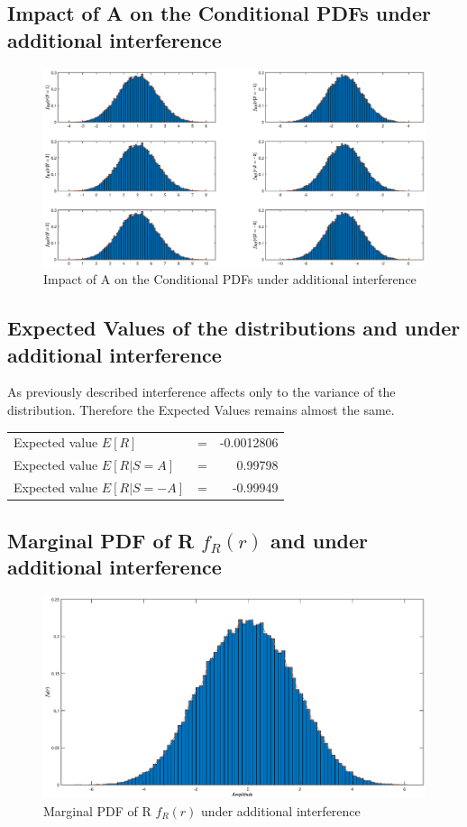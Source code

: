 \documentclass[a4paper,11pt]{article}%
\begin{document}
\pagebreak
\subsection{Impact of A on the Conditional PDFs under additional interference}
\begin{figure}[!h]
	\centering
	\includegraphics[scale=0.45]{figures/q6f3}
	\caption{Impact of A on the Conditional PDFs under additional interference}
\end{figure}

\subsection{Expected Values of the distributions and under additional interference}

As previously described interference affects only to the variance of the distribution. Therefore the Expected Values remains almost the same.\\

\begin{tabular}[!h]{l c r}
	Expected value $E[R]$& = & -0.0012806\\
	Expected value $E[R|S=A]$ &=& 0.99798\\
	Expected value $E[R|S=-A]$& =& -0.99949\\
	
\end{tabular}

\subsection{Marginal PDF of R $f_R(r)$ and under additional interference}
\begin{figure}[!h]
	\centering
	\includegraphics[scale=0.38]{figures/q6f4}
	\caption{Marginal PDF of R $f_R(r)$ under additional interference}
\end{figure}
\end{document}
